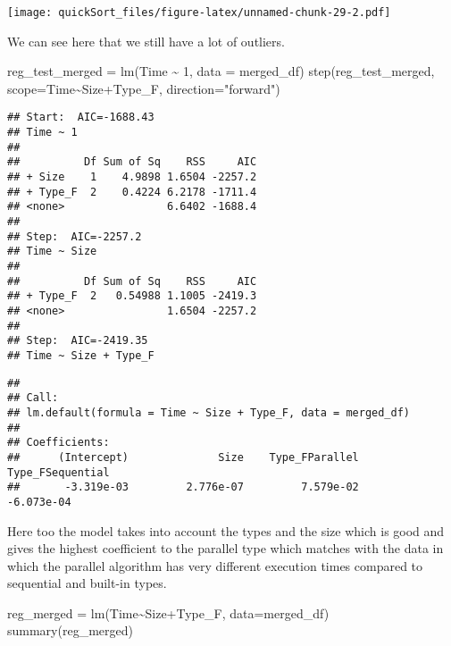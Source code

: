 \documentclass[
]{article}
\newenvironment{Shaded}{\begin{snugshade}}{\end{snugshade}}
\newcommand{\AttributeTok}[1]{\textcolor[rgb]{0.77,0.63,0.00}{#1}}
\newcommand{\DecValTok}[1]{\textcolor[rgb]{0.00,0.00,0.81}{#1}}
\newcommand{\FunctionTok}[1]{\textcolor[rgb]{0.00,0.00,0.00}{#1}}
\newcommand{\NormalTok}[1]{#1}
\newcommand{\OtherTok}[1]{\textcolor[rgb]{0.56,0.35,0.01}{#1}}
\newcommand{\SpecialCharTok}[1]{\textcolor[rgb]{0.00,0.00,0.00}{#1}}
\newcommand{\StringTok}[1]{\textcolor[rgb]{0.31,0.60,0.02}{#1}}
\begin{document}
\texttt{[image: quickSort\_files/figure-latex/unnamed-chunk-29-2.pdf]}

We can see here that we still have a lot of outliers.

\begin{Shaded}
\begin{Highlighting}[]
\NormalTok{reg\_test\_merged }\OtherTok{=} \FunctionTok{lm}\NormalTok{(Time }\SpecialCharTok{\textasciitilde{}} \DecValTok{1}\NormalTok{, }\AttributeTok{data =}\NormalTok{ merged\_df)}
\FunctionTok{step}\NormalTok{(reg\_test\_merged, }\AttributeTok{scope=}\NormalTok{Time}\SpecialCharTok{\textasciitilde{}}\NormalTok{Size}\SpecialCharTok{+}\NormalTok{Type\_F, }\AttributeTok{direction=}\StringTok{"forward"}\NormalTok{)}
\end{Highlighting}
\end{Shaded}

\begin{verbatim}
## Start:  AIC=-1688.43
## Time ~ 1
## 
##          Df Sum of Sq    RSS     AIC
## + Size    1    4.9898 1.6504 -2257.2
## + Type_F  2    0.4224 6.2178 -1711.4
## <none>                6.6402 -1688.4
## 
## Step:  AIC=-2257.2
## Time ~ Size
## 
##          Df Sum of Sq    RSS     AIC
## + Type_F  2   0.54988 1.1005 -2419.3
## <none>                1.6504 -2257.2
## 
## Step:  AIC=-2419.35
## Time ~ Size + Type_F
\end{verbatim}

\begin{verbatim}
## 
## Call:
## lm.default(formula = Time ~ Size + Type_F, data = merged_df)
## 
## Coefficients:
##      (Intercept)              Size    Type_FParallel  Type_FSequential  
##       -3.319e-03         2.776e-07         7.579e-02        -6.073e-04
\end{verbatim}

Here too the model takes into account the types and the size which is
good and gives the highest coefficient to the parallel type which
matches with the data in which the parallel algorithm has very different
execution times compared to sequential and built-in types.

\begin{Shaded}
\begin{Highlighting}[]
\NormalTok{reg\_merged }\OtherTok{=} \FunctionTok{lm}\NormalTok{(Time}\SpecialCharTok{\textasciitilde{}}\NormalTok{Size}\SpecialCharTok{+}\NormalTok{Type\_F, }\AttributeTok{data=}\NormalTok{merged\_df)}
\FunctionTok{summary}\NormalTok{(reg\_merged)}
\end{Highlighting}
\end{Shaded}
\end{document}
